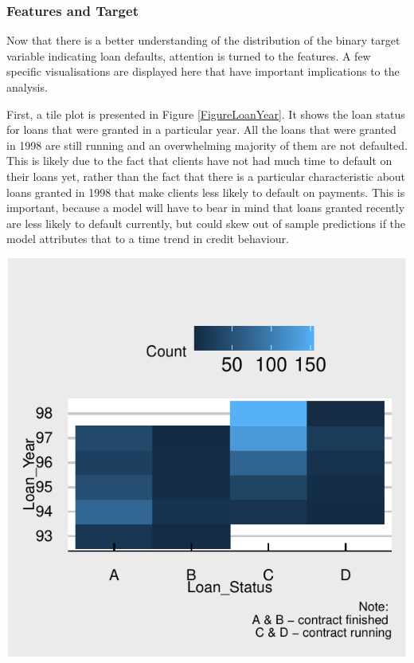 \documentclass[11pt,preprint, authoryear]{elsarticle}
\let\origfigure\figure
\let\endorigfigure\endfigure
\renewenvironment{figure}[1][2] {
    \expandafter\origfigure\expandafter[H]
} {
    \endorigfigure
}
\numberwithin{equation}{section}
\numberwithin{figure}{section}
\numberwithin{table}{section}
\begin{document}
\hypertarget{features-and-target}{%
\subsubsection{Features and Target}\label{features-and-target}}

Now that there is a better understanding of the distribution of the
binary target variable indicating loan defaults, attention is turned to
the features. A few specific visualisations are displayed here that have
important implications to the analysis.

First, a tile plot is presented in Figure \ref{FigureLoanYear}. It shows
the loan status for loans that were granted in a particular year. All
the loans that were granted in 1998 are still running and an
overwhelming majority of them are not defaulted. This is likely due to
the fact that clients have not had much time to default on their loans
yet, rather than the fact that there is a particular characteristic
about loans granted in 1998 that make clients less likely to default on
payments. This is important, because a model will have to bear in mind
that loans granted recently are less likely to default currently, but
could skew out of sample predictions if the model attributes that to a
time trend in credit behaviour.

\begin{figure}[H]

{\centering \includegraphics{DS-Report-20065124_files/figure-latex/FigureLoanYear-1} 

}

\caption{Loan Status By Year Loan Was Granted  \label{FigureLoanYear}}\label{fig:FigureLoanYear}
\end{figure}
\end{document}
